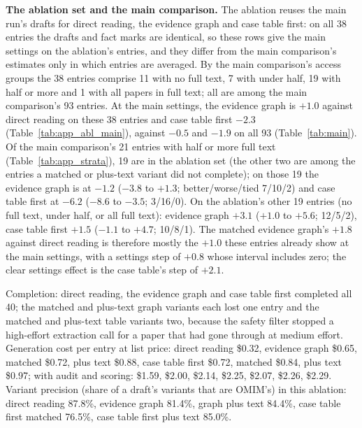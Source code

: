 \documentclass{article} %
\begin{document}
\textbf{The ablation set and the main comparison.} The ablation reuses the main run's drafts for direct reading, the evidence graph and case table first: on all 38 entries the drafts and fact marks are identical, so these rows give the main settings on the ablation's entries, and they differ from the main comparison's estimates only in which entries are averaged. By the main comparison's access groups the 38 entries comprise 11 with no full text, 7 with under half, 19 with half or more and 1 with all papers in full text; all are among the main comparison's 93 entries. At the main settings, the evidence graph is $+1.0$ against direct reading on these 38 entries and case table first $-2.3$ (Table~\ref{tab:app_abl_main}), against $-0.5$ and $-1.9$ on all 93 (Table~\ref{tab:main}). Of the main comparison's 21 entries with half or more full text (Table~\ref{tab:app_strata}), 19 are in the ablation set (the other two are among the entries a matched or plus-text variant did not complete); on those 19 the evidence graph is at $-1.2$ ($-3.8$ to $+1.3$; better/worse/tied 7/10/2) and case table first at $-6.2$ ($-8.6$ to $-3.5$; 3/16/0). On the ablation's other 19 entries (no full text, under half, or all full text): evidence graph $+3.1$ ($+1.0$ to $+5.6$; 12/5/2), case table first $+1.5$ ($-1.1$ to $+4.7$; 10/8/1). The matched evidence graph's $+1.8$ against direct reading is therefore mostly the $+1.0$ these entries already show at the main settings, with a settings step of $+0.8$ whose interval includes zero; the clear settings effect is the case table's step of $+2.1$.

Completion: direct reading, the evidence graph and case table first completed all 40; the matched and plus-text graph variants each lost one entry and the matched and plus-text table variants two, because the safety filter stopped a high-effort extraction call for a paper that had gone through at medium effort. Generation cost per entry at list price: direct reading \$0.32, evidence graph \$0.65, matched \$0.72, plus text \$0.88, case table first \$0.72, matched \$0.84, plus text \$0.97; with audit and scoring: \$1.59, \$2.00, \$2.14, \$2.25, \$2.07, \$2.26, \$2.29. Variant precision (share of a draft's variants that are OMIM's) in this ablation: direct reading 87.8\%, evidence graph 81.4\%, graph plus text 84.4\%, case table first matched 76.5\%, case table first plus text 85.0\%.
\end{document}
